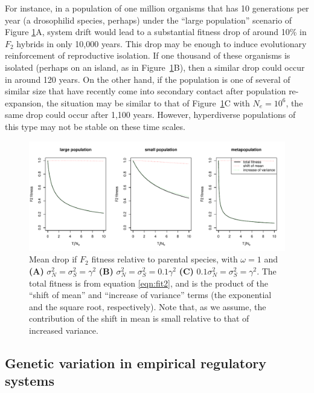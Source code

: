 \documentclass{article}
\newcommand{\1}{\mathbbm{1}}
\begin{document}
For instance, in a population of one million organisms that has 10 generations per year (a drosophilid species, perhaps)
under the ``large population'' scenario of Figure \ref{fig:speciation_rates}A,
system drift would lead to a substantial fitness drop of around 10\% in $F_2$ hybrids in only 10,000 years.
This drop may be enough to induce evolutionary reinforcement of reproductive isolation.
If one thousand of these organisms is isolated (perhaps on an island, as in Figure~\ref{fig:speciation_rates}B),
then a similar drop could occur in around 120 years.
On the other hand, if the population is one of several of similar size
that have recently come into secondary contact after population re-expansion,
the situation may be similar to that of Figure~\ref{fig:speciation_rates}C with $N_e = 10^6$,
the same drop could occur after 1,100 years.
However, hyperdiverse populations of this type may not be stable on these time scales.


\begin{figure}[H]
\label{fig:speciation_rates}
\begin{center}
\includegraphics{speciation_rates}
\caption{
Mean drop if $F_2$ fitness relative to parental species,
with $\omega=1$ and 
\textbf{(A)} $\sigma_N^2 = \sigma_S^2 = \gamma^2$
\textbf{(B)} $\sigma_N^2 = \sigma_S^2 = 0.1 \gamma^2$
\textbf{(C)} $0.1 \sigma_N^2 = \sigma_S^2 = \gamma^2$.
The total fitness is from equation \eqref{eqn:fit2},
and is the product of the ``shift of mean'' and ``increase of variance'' terms
(the exponential and the square root, respectively).
Note that, as we assume, the contribution of the shift in mean
is small relative to that of increased variance.
\label{fig:speciation_rates}}
\end{center}
\end{figure}


\subsection*{Genetic variation in empirical regulatory systems}
\end{document}
